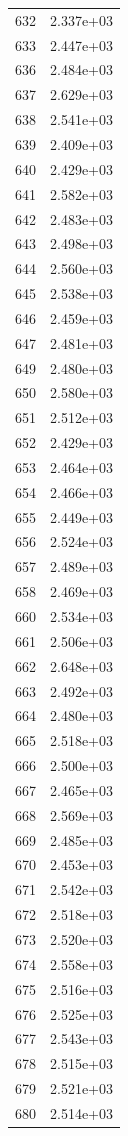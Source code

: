 \documentclass[12pt]{article}
\begin{document}
\begin{longtable}{@{}cc@{}}
632 & 2.337e+03 \\
633 & 2.447e+03 \\
636 & 2.484e+03 \\
637 & 2.629e+03 \\
638 & 2.541e+03 \\
639 & 2.409e+03 \\
640 & 2.429e+03 \\
641 & 2.582e+03 \\
642 & 2.483e+03 \\
643 & 2.498e+03 \\
644 & 2.560e+03 \\
645 & 2.538e+03 \\
646 & 2.459e+03 \\
647 & 2.481e+03 \\
649 & 2.480e+03 \\
650 & 2.580e+03 \\
651 & 2.512e+03 \\
652 & 2.429e+03 \\
653 & 2.464e+03 \\
654 & 2.466e+03 \\
655 & 2.449e+03 \\
656 & 2.524e+03 \\
657 & 2.489e+03 \\
658 & 2.469e+03 \\
660 & 2.534e+03 \\
661 & 2.506e+03 \\
662 & 2.648e+03 \\
663 & 2.492e+03 \\
664 & 2.480e+03 \\
665 & 2.518e+03 \\
666 & 2.500e+03 \\
667 & 2.465e+03 \\
668 & 2.569e+03 \\
669 & 2.485e+03 \\
670 & 2.453e+03 \\
671 & 2.542e+03 \\
672 & 2.518e+03 \\
673 & 2.520e+03 \\
674 & 2.558e+03 \\
675 & 2.516e+03 \\
676 & 2.525e+03 \\
677 & 2.543e+03 \\
678 & 2.515e+03 \\
679 & 2.521e+03 \\
680 & 2.514e+03 \\

\end{longtable}
\end{document}
